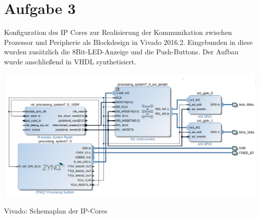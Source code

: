 \section{Aufgabe 3} \label{ex3}

Konfiguration des IP Cores zur Realisierung der Kommunikation zwischen Prozessor und 
Peripherie als Blockdesign in Vivado 2016.2. Eingebunden in diese wurden zusätzlich die 8Bit-LED-Anzeige und die Push-Buttons. Der Aufbau wurde anschließend in VHDL synthetisiert. 

\begin{minipage}{\textwidth}
    \begin{center}        
        \includegraphics[scale=0.6]{img/a3.png} 
    \end{center}
\end{minipage}
\begin{center}
Vivado: Schemaplan der IP-Cores
\end{center}